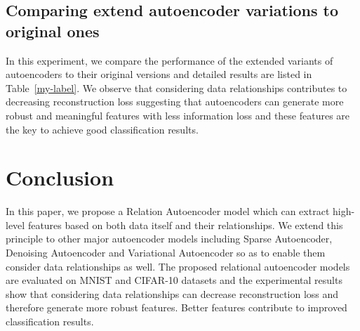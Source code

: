 \documentclass[conference]{IEEEtran}
\begin{document}
	\subsection{Comparing extend autoencoder variations to original ones}
	In this experiment, we compare the performance of the extended variants of autoencoders to their original versions and detailed results are listed in Table~\ref{my-label}. We observe that considering data relationships contributes to decreasing reconstruction loss suggesting that autoencoders can generate more robust and meaningful features with less information loss and these features are the key to achieve good classification results.
		
	\section{Conclusion} \label{sec7}
	In this paper, we propose a Relation Autoencoder model which can extract high-level features based on both data itself and their relationships. We extend this principle to other major autoencoder models including Sparse Autoencoder, Denoising Autoencoder and Variational Autoencoder so as to enable them consider data relationships as well. The proposed relational autoencoder models are evaluated on MNIST and CIFAR-10 datasets and the experimental results show that considering data relationships can decrease reconstruction loss and therefore generate more robust features. Better features contribute to improved classification results.
	



	
	
	
\end{document}
